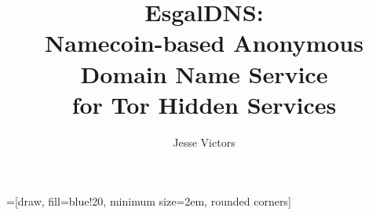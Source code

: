 \documentclass[cs, msthesis]{usuthesis}
\author{Jesse Victors}
\title{EsgalDNS: \\ Namecoin-based Anonymous Domain Name Service \\ for Tor Hidden Services}
\begin{document}
	\preliminaries   %

	\maketitle
	\makecopyright        %
	






=[draw, fill=blue!20, minimum size=2em, rounded corners]



%    
%    
%    
\end{document}
